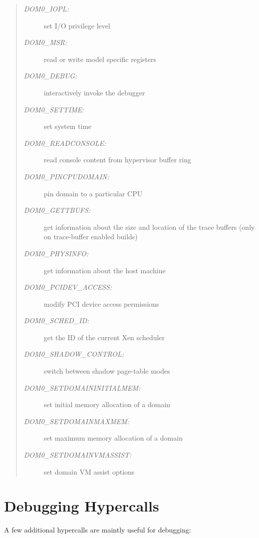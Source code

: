 \documentclass[11pt,twoside,final,openright]{xenstyle}
\begin{document}
\begin{quote}
\begin{description}
\item [\it DOM0\_IOPL:] set I/O privilege level

\item [\it DOM0\_MSR:] read or write model specific registers

\item [\it DOM0\_DEBUG:] interactively invoke the debugger

\item [\it DOM0\_SETTIME:] set system time

\item [\it DOM0\_READCONSOLE:] read console content from hypervisor buffer ring

\item [\it DOM0\_PINCPUDOMAIN:] pin domain to a particular CPU

\item [\it DOM0\_GETTBUFS:] get information about the size and location of
                      the trace buffers (only on trace-buffer enabled builds)

\item [\it DOM0\_PHYSINFO:] get information about the host machine

\item [\it DOM0\_PCIDEV\_ACCESS:] modify PCI device access permissions

\item [\it DOM0\_SCHED\_ID:] get the ID of the current Xen scheduler

\item [\it DOM0\_SHADOW\_CONTROL:] switch between shadow page-table modes

\item [\it DOM0\_SETDOMAININITIALMEM:] set initial memory allocation of a domain

\item [\it DOM0\_SETDOMAINMAXMEM:] set maximum memory allocation of a domain

\item [\it DOM0\_SETDOMAINVMASSIST:] set domain VM assist options
\end{description} 
\end{quote} 





\section{Debugging Hypercalls} 

A few additional hypercalls are maintly useful for debugging: 
\end{document}
